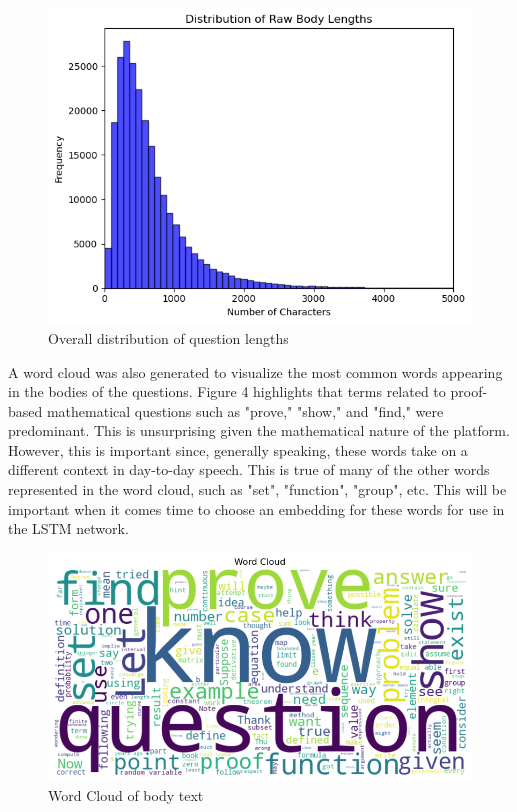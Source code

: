 \documentclass[12pt, letterpaper]{article}
\begin{document}
\begin{figure}[H]
\centering
\includegraphics[scale=0.6]{../figs/exploratory_analysis/length_distribution}
\caption{Overall distribution of question lengths}
\end{figure}
\par A word cloud was also generated to visualize the most common words appearing in the bodies of the questions. Figure 4 highlights that terms related to proof-based mathematical questions such as "prove," "show," and "find," were predominant. This is unsurprising given the mathematical nature of the platform. However, this is important since, generally speaking, these words take on a different context in day-to-day speech. This is true of many of the other words represented in the word cloud, such as "set", "function", "group", etc. This will be important when it comes time to choose an embedding for these words for use in the LSTM network.
\begin{figure}[H]
\centering
\includegraphics[scale=0.6]{../figs/exploratory_analysis/body_wordcloud}
\caption{Word Cloud of body text}
\end{figure}
\end{document}
